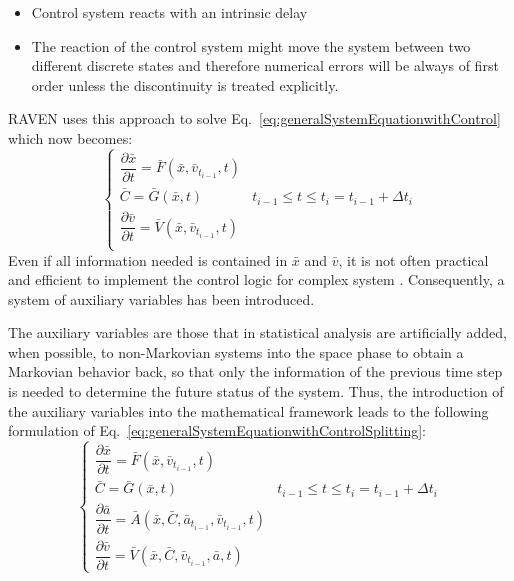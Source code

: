 \begin{itemize}
\item Control system reacts with an intrinsic delay
\item The reaction of the control system might move the system between two different discrete states and
therefore numerical errors will be always of first order unless the discontinuity is treated explicitly.
\end{itemize}
RAVEN uses this approach to solve Eq.~\ref{eq:generalSystemEquationwithControl} which now becomes:
\begin{equation}
\begin{cases} 
\dfrac{\partial \bar{x}}{\partial t} = \bar{F}(\bar{x},\bar{v}_{t_{i-1}},t) \\
\bar{C} = \bar{G}(\bar{x},t) & t_{i-1}\leq t\leq t_{i} = t_{i-1} + \Delta t_{i}\\ 
\dfrac{\partial \bar{v}}{\partial t} = \bar{V}(\bar{x},\bar{v}_{t_{i-1}},t) \\
\end{cases}
\label{eq:generalSystemEquationwithControlSplitting}
\end{equation}
Even if all information needed is contained in $\bar{x}$ and $\bar{v}$, it is not often practical and efficient to implement the control logic for complex system . Consequently, a system of auxiliary variables has been introduced.

The auxiliary variables are those that in statistical analysis are artificially added, when possible, to non-Markovian systems into the space phase to obtain a Markovian behavior back, so that only the information of the previous time step is needed to determine the future status of the system.
Thus, the introduction of the auxiliary variables into the mathematical framework leads to the following formulation of Eq.~\ref{eq:generalSystemEquationwithControlSplitting}:
\vspace{-2mm}
\begin{equation}
\begin{cases} 
\dfrac{\partial \bar{x}}{\partial t} = \bar{F}(\bar{x},\bar{v}_{t_{i-1}},t) \\
\bar{C} = \bar{G}(\bar{x},t) & t_{i-1}\leq t\leq t_{i} = t_{i-1} + \Delta t_{i}\\ 
\dfrac{\partial \bar{a}}{\partial t} = \bar{A}(\bar{x},\bar{C},\bar{a}_{t_{i-1}},\bar{v}_{t_{i-1}},t) \\
\dfrac{\partial \bar{v}}{\partial t} = \bar{V}(\bar{x},\bar{C},\bar{v}_{t_{i-1}},\bar{a},t) 
\end{cases}
\label{eq:generalSystemEquationwithControlSplittingAndAux}
\end{equation}

